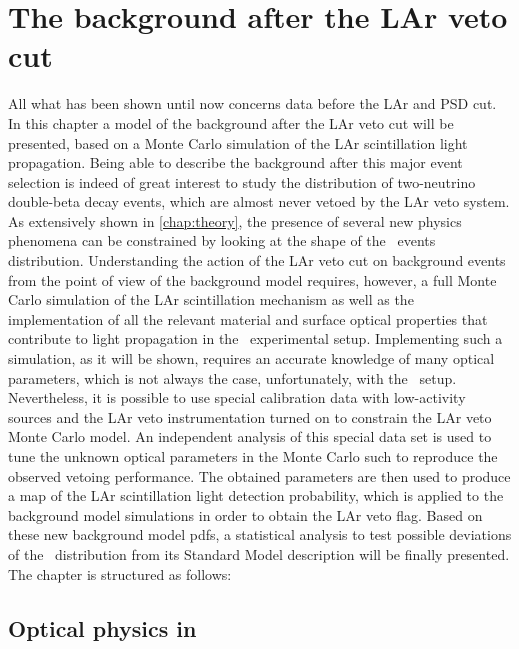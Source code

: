 
\chapter{The background after the LAr veto cut}\label{chap:bkg:lar:ph2}

All what has been shown until now concerns data before the LAr and PSD cut. In this
chapter a model of the background after the LAr veto cut will be presented, based on a
Monte Carlo simulation of the LAr scintillation light propagation. Being able to describe
the background after this major event selection is indeed of great interest to study the
distribution of two-neutrino double-beta decay events, which are almost never vetoed by
the LAr veto system. As extensively shown in \cref{chap:theory}, the presence of several
new physics phenomena can be constrained by looking at the shape of the \nnbb\ events
distribution. Understanding the action of the LAr veto cut on background events from the
point of view of the background model requires, however, a full Monte Carlo simulation of
the LAr scintillation mechanism as well as the implementation of all the relevant material
and surface optical properties that contribute to light propagation in the \gerda\ experimental
setup. Implementing such a simulation, as it will be shown, requires an accurate knowledge
of many optical parameters, which is not always the case, unfortunately, with the \gerda\
setup. Nevertheless, it is possible to use special calibration data with low-activity
sources and the LAr veto instrumentation turned on to constrain the LAr veto Monte Carlo
model. An independent analysis of this special data set is used to tune the unknown
optical parameters in the Monte Carlo such to reproduce the observed vetoing performance.
The obtained parameters are then used to produce a map of the LAr scintillation light
detection probability, which is applied to the background model simulations in order to
obtain the LAr veto flag. Based on these new background model pdfs, a statistical analysis
to test possible deviations of the \nnbb\ distribution from its Standard Model description
will be finally presented.
\newpar
The chapter is structured as follows: 

\section{Optical physics in \mage}%
\label{sec:bkg:lar:ph2:mage}

